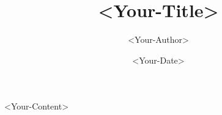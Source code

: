 \documentclass{article}
\title{<Your-Title>}
\author{<Your-Author>}
\date{<Your-Date>}
\begin{document}

\maketitle

<Your-Content>
\end{document}
